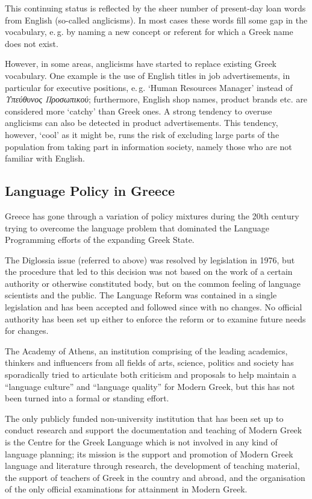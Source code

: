\begin{multicols}{2}
This continuing status is reflected by the sheer number of present-day loan words from English (so-called anglicisms). In most cases these words fill some gap in the vocabulary, e.\,g. by naming a new concept or referent for which a Greek name does not exist.

However, in some areas, anglicisms have started to replace existing Greek vocabulary. One example is the use of English titles in job advertisements, in particular for executive positions, e.\,g. ‘Human Resources Manager’ instead of \textit{Υπεύθυνος Προσωπικού}; furthermore, English shop names, product brands etc. are considered more ‘catchy’ than Greek ones. A strong tendency to overuse anglicisms can also be detected in product advertisements. This tendency, however, ‘cool’ as it might be, runs the risk of excluding large parts of the population from taking part in information society, namely those who are not familiar with English.

\subsection{Language Policy in Greece}

Greece has gone through a variation of policy mixtures during the 20th century trying to overcome the language problem that dominated the Language Programming efforts of the expanding Greek State.

The Diglossia issue (referred to above) was resolved by legislation in 1976, but the procedure that led to this decision was not based on the work of a certain authority or otherwise constituted body, but on the common feeling of language scientists and the public. The Language Reform was contained in a single legislation and has been accepted and followed since with no changes. No official authority has been set up either to enforce the reform or to examine future needs for changes.

The Academy of Athens, an institution comprising of the leading academics, thinkers and influencers from all fields of arts, science, politics and society has sporadically tried to articulate both criticism and proposals to help maintain a “language culture” and “language quality” for Modern Greek, but this has not been turned into a formal or standing effort.

The only publicly funded non-university institution that has been set up to conduct research and support the documentation and teaching of Modern Greek is the Centre for the Greek Language which is not involved in any kind of language planning; its mission is the support and promotion of Modern Greek language and literature through research, the development of teaching material, the support of teachers of Greek in the country and abroad, and the organisation of the only official examinations for attainment in Modern Greek.


\end{multicols}
